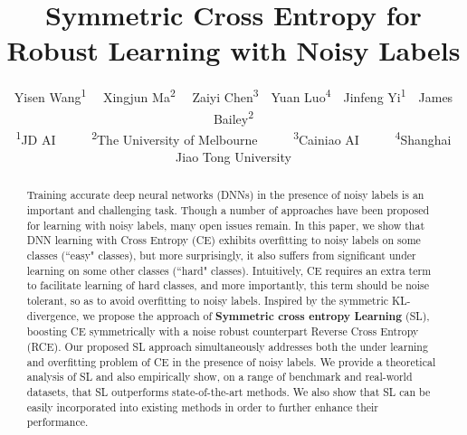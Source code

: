 \documentclass[10pt,twocolumn,letterpaper]{article}
\begin{document}
\title{Symmetric Cross Entropy for Robust Learning with Noisy Labels}

\author{
Yisen Wang\textsuperscript{1}\textsuperscript{\footnotemark[1]} \footnotemark[2] \ \  Xingjun Ma\textsuperscript{2}\textsuperscript{\footnotemark[1]} \footnotemark[2] \ \ Zaiyi Chen\textsuperscript{3}\ \ Yuan Luo\textsuperscript{4}\ \ Jinfeng Yi\textsuperscript{1}\ \  James Bailey\textsuperscript{2}\\
  \textsuperscript{1}JD AI \ \ \ \ \ 
  \textsuperscript{2}The University of Melbourne \ \ \ \ \ \textsuperscript{3}Cainiao AI \ \ \ \ \ \textsuperscript{4}Shanghai Jiao Tong University  \\
}

\maketitle

\renewcommand{\thefootnote}{\fnsymbol{footnote}}   

\thispagestyle{empty}

\begin{abstract}
Training accurate deep neural networks (DNNs) in the presence of noisy labels is an important and challenging task. Though a number of approaches have been proposed for learning with noisy labels, many open issues remain. In this paper, we show that DNN learning with Cross Entropy (CE) exhibits overfitting to noisy labels on some classes (``easy" classes), but more surprisingly, it also suffers from significant under learning on some other classes (``hard" classes). Intuitively, CE requires an extra term to facilitate learning of hard classes, and more importantly, this term should be noise tolerant, so as to avoid overfitting to noisy labels. Inspired by the symmetric KL-divergence, we propose the approach of \textbf{Symmetric cross entropy Learning} (SL), boosting CE symmetrically with a noise robust counterpart Reverse Cross Entropy (RCE). Our proposed SL approach simultaneously addresses both the under learning and overfitting problem of CE in the presence of noisy labels. We provide a theoretical analysis of SL and also empirically show, on a range of benchmark and real-world datasets, that SL outperforms state-of-the-art methods. We also show that SL can be easily incorporated into existing methods in order to further enhance their performance.
\end{abstract}
\end{document}
